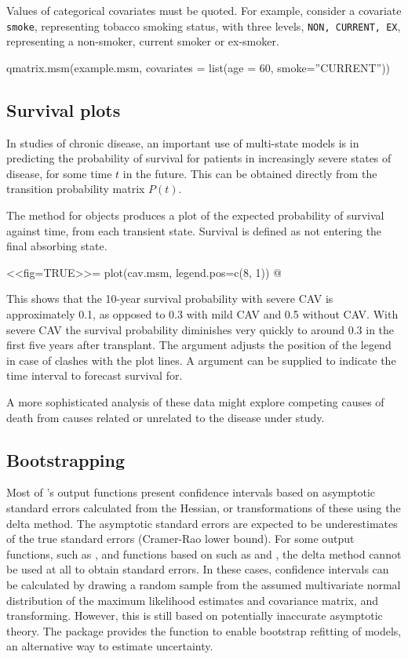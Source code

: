 Values of categorical covariates must be quoted. For example, consider
a covariate \texttt{smoke}, representing tobacco smoking status, with
three levels, \texttt{NON, CURRENT, EX}, representing a non-smoker,
current smoker or ex-smoker.

\begin{Scode}
qmatrix.msm(example.msm, covariates = list(age = 60, smoke=''CURRENT''))
\end{Scode}


\subsection{Survival plots}

In studies of chronic disease, an important use of multi-state models
is in predicting the probability of survival for patients in
increasingly severe states of disease, for some time $t$ in the
future.  This can be obtained directly from the transition probability
matrix $P(t)$.

The  method for  objects produces a plot
of the expected probability of survival against time, from each
transient state. Survival is defined as not entering the final
absorbing state.

<<fig=TRUE>>=
plot(cav.msm, legend.pos=c(8, 1))
@

This shows that the 10-year survival probability with severe CAV is
approximately 0.1, as opposed to 0.3 with mild CAV and 0.5 without
CAV.  With severe CAV the survival probability diminishes very quickly
to around 0.3 in the first five years after transplant.  The
 argument adjusts the position of the legend in
case of clashes with the plot lines.  A  argument can
be supplied to indicate the time interval to forecast survival for.

A more sophisticated analysis of these data might explore competing
causes of death from causes related or unrelated to the disease under
study.

\subsection{Bootstrapping}
\label{sec:boot}
Most of 's output functions present confidence intervals
based on asymptotic standard errors calculated from the Hessian, or
transformations of these using the delta method.  The asymptotic
standard errors are expected to be underestimates of the true standard
errors (Cramer-Rao lower bound).  For some output functions, such as
, and functions based on
 such as  and
, the delta method cannot be used at all to
obtain standard errors.  In these cases, confidence intervals can be
calculated by drawing a random sample from the assumed multivariate
normal distribution of the maximum likelihood estimates and covariance
matrix, and transforming.  However, this is still based on potentially
inaccurate asymptotic theory.  The  package provides the
function  to enable bootstrap refitting of
 models, an alternative way to estimate uncertainty.

